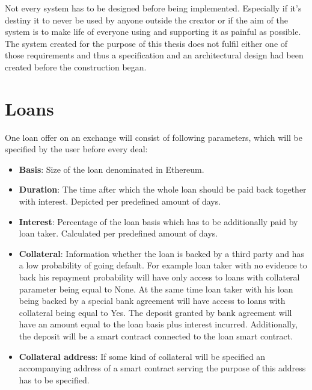 \documentclass[a4paper,12pt,twoside,openany]{report}
\begin{document}
Not every system has to be designed before being implemented. Especially if it's destiny it to never be used by anyone outside the creator or if the aim of the system is to make life of everyone using and supporting it as painful as possible. The system created for the purpose of this thesis does not fulfil either one of those requirements and thus a specification and an architectural design had been created before the construction  began.

\section{Loans} \label{loans}
One loan offer on an exchange will consist of following parameters, which will be specified by the user before every deal:
\begin{itemize}
\item \textbf{Basis}: Size of the loan denominated in Ethereum.
\item \textbf{Duration}: The time after which the whole loan should be paid back together with interest. Depicted per predefined amount of days.
\item \textbf{Interest}: Percentage of the loan basis which has to be additionally paid by loan taker. Calculated per predefined amount of days.
\item \textbf{Collateral}: Information whether the loan is backed by a third party and has a low probability of going default. For example loan taker with no evidence to back his repayment probability will have only access to loans with collateral parameter being equal to None. At the same time loan taker with his loan being backed by a special bank agreement will have access to loans with collateral being equal to Yes. The deposit granted by bank agreement will have an amount equal to the loan basis plus interest incurred. Additionally, the deposit will be a smart contract connected to the loan smart contract.
\item \textbf{Collateral address}: If some kind of collateral will be specified an accompanying address of a smart contract serving the purpose of this address has to be specified. 
\end{itemize}
\end{document}
